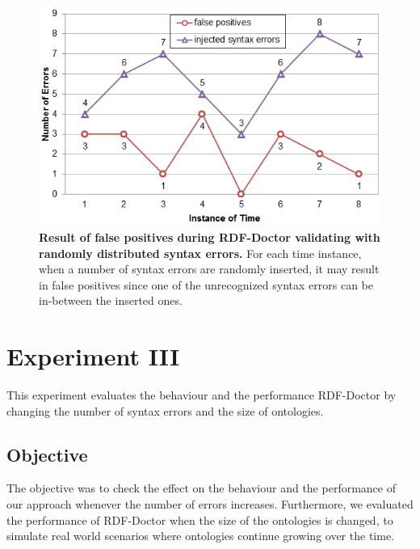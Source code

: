 \begin{figure}[ht]
	\begin{center}
		\includegraphics[width=0.9\linewidth,angle=0]{images/Experiment02-03.png}
				\vspace*{-4mm}

		\caption{\textbf{Result of false positives during RDF-Doctor validating with randomly distributed syntax errors.}
		For each time instance, when a number of syntax errors are randomly inserted, it may result in false positives since one of the unrecognized syntax errors can be in-between the inserted ones.} 
		\label{Fig:Experiment02-03}
	\end{center}
\end{figure}
 


\section{Experiment III}

This experiment evaluates the behaviour and the performance RDF-Doctor by changing the number of syntax errors and the size of ontologies. 

\subsection{Objective}
The objective was to check the effect on the behaviour and the performance of our approach whenever the number of errors increases.
Furthermore, we evaluated the performance of RDF-Doctor when the size of the ontologies is changed, to simulate real world scenarios where ontologies continue growing over the time.



